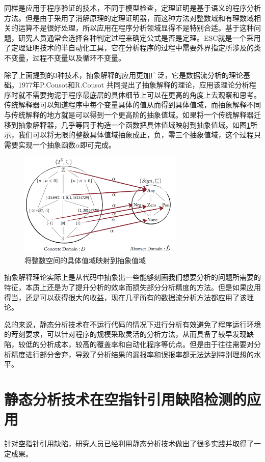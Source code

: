同样是应用于程序验证的技术，不同于模型检查，定理证明\cite{tiwari2007logical}是基于语义的程序分析方法。但是由于采用了消解原理的定理证明器，而这种方法对整数域和有理数域相关的运算不是很好处理，所以应用在程序分析领域显得不是特别合适。基于这种问题，研究人员通常会选择各种判定过程来确定公式是否是定理。ESC\cite{flanagan2013pldi}就是一个采用了定理证明技术的半自动化工具，它在分析程序的过程中需要外界指定所涉及的类不变量，过程不变量以及循环不变量。

除了上面提到的3种技术，抽象解释\cite{cousot1977abstract}的应用更加广泛，它是数据流分析的理论基础。1977年P.Cousot和R.Cousot
共同提出了抽象解释的理论，应用该理论分析程序时就不需要拘泥于程序最底层的具体细节上可以在更高的角度上去观察和思考。传统解释器可以知道程序中每个变量具体的值从而得到具体值域，而抽象解释不同与传统解释的地方就是可以得到一个更高阶的抽象值域。如果将一个传统解释器迁移到抽象解释器，几乎等同于构造一个函数把具体值域映射到抽象值域。如图\ref{fig:figure2-1}所示，我们可以将无限的整数具体值域抽象成正，负，零三个抽象值域，这个过程只需要实现一个抽象函数$\alpha$即可完成。
 \begin{figure}
	\centering
	\includegraphics[width=0.70\textwidth]{figures/AbstractInterpretation2-1}
	\caption{将整数空间的具体值域映射到抽象值域}\label{fig:figure2-1}
\end{figure}

抽象解释理论实际上是从代码中抽象出一些能够刻画我们想要分析的问题所需要的特征，本质上还是为了提升分析的效率而损失部分分析精度的方法。但是如果应用得当，还是可以获得很大的收益，现在几乎所有的数据流分析方法都应用了该理论。

总的来说，静态分析技术在不运行代码的情况下进行分析有效避免了程序运行环境的苛刻要求，可以针对程序的规模采取灵活的分析方法，从而具备了较早发现缺陷，较低的分析成本，较高的覆盖率和自动化程序等优点。但是由于往往需要对分析精度进行部分舍弃，导致了分析结果的漏报率和误报率都无法达到特别理想的水平。

\section{静态分析技术在空指针引用缺陷检测的应用}
针对空指针引用缺陷，研究人员已经利用静态分析技术做出了很多实践并取得了一定成果。

